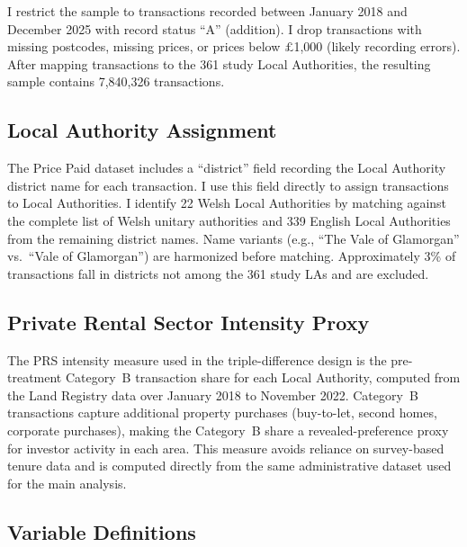 \documentclass[12pt]{article}
\begin{document}
I restrict the sample to transactions recorded between January 2018 and December 2025 with record status ``A'' (addition). I drop transactions with missing postcodes, missing prices, or prices below $\pounds$1,000 (likely recording errors). After mapping transactions to the 361 study Local Authorities, the resulting sample contains 7,840,326 transactions.

\subsection{Local Authority Assignment}

The Price Paid dataset includes a ``district'' field recording the Local Authority district name for each transaction. I use this field directly to assign transactions to Local Authorities. I identify 22 Welsh Local Authorities by matching against the complete list of Welsh unitary authorities and 339 English Local Authorities from the remaining district names. Name variants (e.g., ``The Vale of Glamorgan'' vs.\ ``Vale of Glamorgan'') are harmonized before matching. Approximately 3\% of transactions fall in districts not among the 361 study LAs and are excluded.

\subsection{Private Rental Sector Intensity Proxy}

The PRS intensity measure used in the triple-difference design is the pre-treatment Category~B transaction share for each Local Authority, computed from the Land Registry data over January 2018 to November 2022. Category~B transactions capture additional property purchases (buy-to-let, second homes, corporate purchases), making the Category~B share a revealed-preference proxy for investor activity in each area. This measure avoids reliance on survey-based tenure data and is computed directly from the same administrative dataset used for the main analysis.

\subsection{Variable Definitions}
\end{document}
